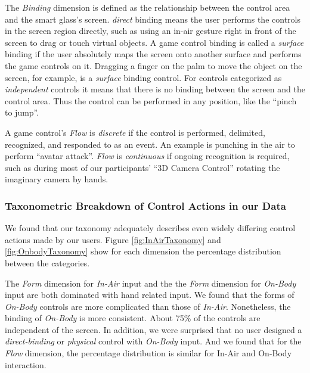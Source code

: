 \documentclass{sigchi}
\begin{document}
The \emph{Binding} dimension is defined as the relationship between the control area and the smart glass's screen. \emph{direct} binding means the user performs the controls in the screen region directly, such as using an in-air gesture right in front of the screen to drag or touch virtual objects. A game control binding is called a \emph{surface} binding if the user absolutely maps the screen onto another surface and performs the game controls on it. Dragging a finger on the palm to move the object on the screen, for example, is a \emph{surface} binding control. For controls categorized as \emph{independent} controls it means that there is no binding between the screen and the control area. Thus the control can be performed in any position, like the ``pinch to jump''.

  A game control's \emph{Flow} is \emph{discrete} if the control is performed, delimited, recognized, and responded to as an event. An example is punching in the air to perform ``avatar attack''. \emph{Flow} is \emph{continuous} if ongoing recognition is required, such as during most of our participants' ``3D Camera Control'' rotating the imaginary camera by hands. 
 

 \subsubsection{Taxonometric Breakdown of Control Actions in our Data}
We found that our taxonomy adequately describes even widely differing control actions made by our users. Figure \ref{fig:InAirTaxonomy} and \ref{fig:OnbodyTaxonomy} show for each dimension the percentage distribution between the categories.

The \emph{Form} dimension for \emph{In-Air} input and the the \emph{Form} dimension for \emph{On-Body} input are both dominated with hand related input. We found that the forms of \emph{On-Body} controls are more complicated than those of \emph{In-Air}. Nonetheless, the binding of \emph{On-Body} is more consistent. About 75\% of the controls are independent of the screen. In addition, we were surprised that no user designed a \emph{direct-binding} or \emph{physical} control with \emph{On-Body} input. And we found that for the \emph{Flow} dimension, the percentage distribution is similar for In-Air and On-Body interaction.
\end{document}
